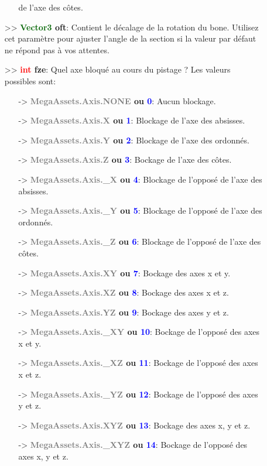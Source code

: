 \documentclass[a4paper, 11pt]{article}
\begin{document}
\begin{description}
\begin{itemize}
\begin{itemize}
				de l'axe des côtes.
			\end{itemize}
			\item[>> \textbf{\textcolor{darkgreen}{Vector3} oft}:] Contient le décalage de la rotation du 
			bone. Utilisez cet paramètre pour ajuster l'angle de la section si la valeur par défaut ne 
			répond pas à vos attentes.
			\item[>> \textbf{\textcolor{red}{int} fze}:] Quel axe bloqué au cours du pistage ? Les valeurs 
			possibles sont:
			\begin{itemize}
				\item [-> \textbf{\textcolor{gray}{MegaAssets.Axis.NONE} ou \textcolor{blue}{0}}:] Aucun 
				blockage.
				\item [-> \textbf{\textcolor{gray}{MegaAssets.Axis.X} ou \textcolor{blue}{1}}:] Blockage de 
				l'axe des absisses.
				\item [-> \textbf{\textcolor{gray}{MegaAssets.Axis.Y} ou \textcolor{blue}{2}}:] Blockage de 
				l'axe des ordonnés.
				\item [-> \textbf{\textcolor{gray}{MegaAssets.Axis.Z} ou \textcolor{blue}{3}}:] Bockage de 
				l'axe des côtes.
				\item [-> \textbf{\textcolor{gray}{MegaAssets.Axis.\_X} ou \textcolor{blue}{4}}:] Blockage 
				de l'opposé de l'axe des absisses.
				\item [-> \textbf{\textcolor{gray}{MegaAssets.Axis.\_Y} ou \textcolor{blue}{5}}:] Blockage 
				de l'opposé de l'axe des ordonnés.
				\item [-> \textbf{\textcolor{gray}{MegaAssets.Axis.\_Z} ou \textcolor{blue}{6}}:] Blockage 
				de l'opposé de l'axe des côtes.
				\item [-> \textbf{\textcolor{gray}{MegaAssets.Axis.XY} ou \textcolor{blue}{7}}:] Bockage des 
				axes x et y.
				\item [-> \textbf{\textcolor{gray}{MegaAssets.Axis.XZ} ou \textcolor{blue}{8}}:] Bockage des 
				axes x et z.
				\item [-> \textbf{\textcolor{gray}{MegaAssets.Axis.YZ} ou \textcolor{blue}{9}}:] Bockage des 
				axes y et z.
				\item [-> \textbf{\textcolor{gray}{MegaAssets.Axis.\_XY} ou \textcolor{blue}{10}}:] Bockage 
				de l'opposé des axes x et y.
				\item [-> \textbf{\textcolor{gray}{MegaAssets.Axis.\_XZ} ou \textcolor{blue}{11}}:] Bockage 
				de l'opposé des axes x et z.
				\item [-> \textbf{\textcolor{gray}{MegaAssets.Axis.\_YZ} ou \textcolor{blue}{12}}:] Bockage 
				de l'opposé des axes y et z.
				\item [-> \textbf{\textcolor{gray}{MegaAssets.Axis.XYZ} ou \textcolor{blue}{13}}:] Bockage 
				des axes x, y et z.
				\item [-> \textbf{\textcolor{gray}{MegaAssets.Axis.\_XYZ} ou \textcolor{blue}{14}}:] Bockage 
				de l'opposé des axes x, y et z.\\
			\end{itemize}
		\end{itemize}
	\end{description}
\end{document}
